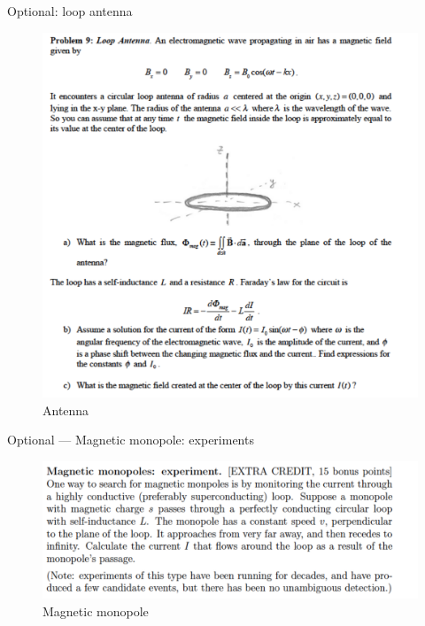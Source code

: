 \documentclass[makesolutionspdf]{esg8022pset}
\begin{document}
\begin{problem}{Optional: loop antenna}
\begin{figure}[H]
    \centering
    \includegraphics[width = 15cm]{loopantenna}
    \caption{Antenna}
  \end{figure}
\end{problem}





\begin{problem}{Optional --- Magnetic monopole: experiments}

 \begin{figure}[H]
    \centering
    \includegraphics[width = 15cm]{monopoles}
    \caption{Magnetic monopole}
  \end{figure}

\end{problem}
\end{document}
